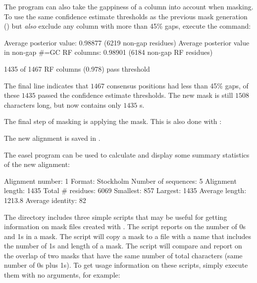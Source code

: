 The  program can also take the gappiness of a
column into account when masking. To use the same confidence estimate
thresholds as the previous  mask generation
() but \emph{also} exclude any column 
with more than 45\% gaps, execute the command:


\begin{sreoutput}
Average posterior value:                            0.98877 (6219 non-gap residues)
Average posterior value in non-gap #=GC RF columns: 0.98901 (6184 non-gap RF residues)

1435 of 1467 RF columns (0.978) pass threshold
\end{sreoutput}

The final line indicates that $1467$ consensus positions had less
than 45\% gaps, of these $1435$ passed the confidence estimate
thresholds. The new mask  is still $1508$ characters
long, but now contains only $1435$ s.

The final step of masking is applying the mask. This is also done with
:


The new alignment is saved in .

The easel program  can be used to calculate and
display some summary statistics of the new alignment:


\begin{sreoutput}
Alignment number:    1
Format:              Stockholm
Number of sequences: 5
Alignment length:    1435
Total # residues:    6069
Smallest:            857
Largest:             1435
Average length:      1213.8
Average identity:    82%
\end{sreoutput}

The  directory includes three simple
 scripts that may be useful for getting information on mask
files created with . The 
script reports on the number of {0}s and {1}s in a mask. The
 script will copy a mask to a file with a name
that includes the number of {1}s and length of a mask. The
 script will compare and report on
the overlap of two masks that have the same number of total characters
(same number of {0}s plus {1}s). To get usage information on these
scripts, simply execute them with no arguments, for example:

